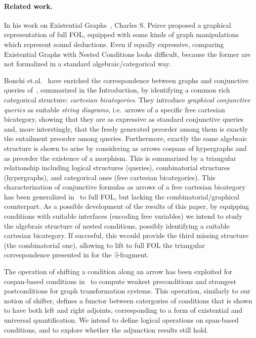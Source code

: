 
\paragraph{Related work.}

In his work on Existential Graphs~\cite{roberts1973-the-existential-graphs-of-charles-s.-peirce}, Charles S. Peirce proposed a graphical representation of full FOL, equipped with some kinds of graph manipulations which represent sound deductions. Even if equally expressive, comparing Existential Graphs with Nested Conditions looks difficult, because the former are not formalized in a standard algebraic/categorical way.

Bonchi et.al.~\cite{DBLP:conf/csl/BonchiSS18} have enriched the correspondence between graphs and conjunctive queries of~\cite{DBLP:conf/stoc/ChandraM77}, summarized in the Introduction,  by identifying a common rich categorical structure: \emph{cartesian bicategories}. They introduce \emph{graphical conjunctive queries} as suitable \emph{string diagrams}, i.e.~arrows of a specific free cartesian bicategory, showing that they are as expressive as standard conjunctive queries and, more interstingly, that the freely generated preorder among them is exactly the entailment preorder among queries. Furthermore, exactly the same algebraic structure is shown to arise by considering as arrows cospans of hypergraphs and as preorder the existence of a morphism. This is summarized by a triangular relationship including logical structures (queries), combinatorial structures (hypergraphs), and categorical ones (free cartesian bicategories).  This characterization of conjunctive formulas as arrows of a free cartesian bicategory has been generalized in~\cite{DBLP:journals/corr/abs-2404-18795} to full FOL, but lacking the combinatorial/graphical counterpart. As a possible development of the results of this paper, by equipping conditions with suitable interfaces (encoding free variables) we intend to study the algebraic structure of nested conditions, possibly identifying a suitable cartesian bicategory. If succesful, this wcould provide the third missing structure (the combinatorial one), allowing to lift to full FOL the triangular correspondence presented in \cite{DBLP:conf/csl/BonchiSS18} for the $\exists$-fragment.


The operation of shifting a condition along an arrow has been exploited for cospan-based conditions in~\cite{bchk:conditional-reactive-systems} to compute weakest preconditions and strongest postconditions for graph transformation systems. This operation, similarly to our notion of shifter, defines a functor between catergories of conditions that is shown to have both left and right adjoints, corresponding to a form of existential and universal quantification.  We intend to define logical operations on span-based conditions, and to explore whether the adjunction results still hold.

